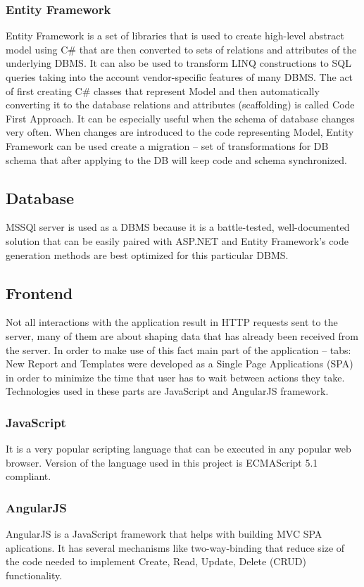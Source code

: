 \documentclass[12pt, twoside, openany]{report}
\theoremstyle{definition}
\begin{document}
\subsubsection{Entity Framework}
Entity Framework is a set of libraries that is used to create high-level abstract model using C\# that are then converted to sets of relations and attributes of the underlying DBMS. It can also be used to transform LINQ constructions to SQL queries taking into the account vendor-specific features of many DBMS.
The act of first creating C\# classes that represent Model and then automatically converting it to the database relations and attributes (scaffolding) is called Code First Approach. It can be especially useful when the schema of database changes very often. When changes are introduced to the code representing Model, Entity Framework can be used create a migration  -- set of transformations for DB schema that after applying to the DB will keep code and schema synchronized. 

\subsection{Database}
MSSQl server is used as a DBMS because it is a battle-tested, well-documented solution that can be easily paired with ASP.NET and Entity Framework's code generation methods are best optimized for this particular DBMS. 

\subsection{Frontend}
Not all interactions with the application result in HTTP requests sent to the server, many of them are about shaping data that has already been received from the server. In order to make use of this fact main part of the application -- tabs: New Report and Templates were developed as a Single Page Applications (SPA) in order to minimize the time that user has to wait between actions they take. Technologies used in these parts are JavaScript and AngularJS framework. 

\subsubsection{JavaScript}
It is a very popular scripting language that can be executed in any popular web browser. Version of the language used in this project is ECMAScript 5.1 compliant. 
\subsubsection{AngularJS}
AngularJS is a JavaScript framework that helps with building MVC SPA aplications. It has several mechanisms like two-way-binding that reduce size of the code needed to implement Create, Read, Update, Delete (CRUD) functionality.
\end{document}
